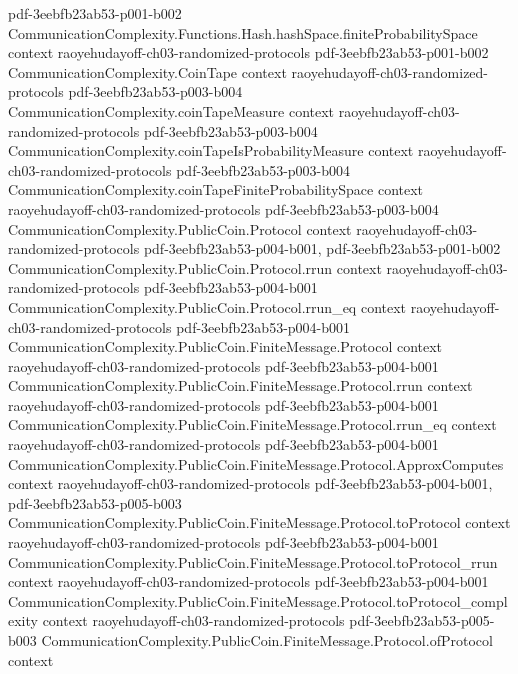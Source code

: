 \begin{theorem}
  {pdf-3eebfb23ab53-p001-b002}
\proofstep
  {CommunicationComplexity.Functions.Hash.hashSpace.finiteProbabilitySpace}
  {context}
  {raoyehudayoff-ch03-randomized-protocols}
  {pdf-3eebfb23ab53-p001-b002}
\proofstep
  {CommunicationComplexity.CoinTape}
  {context}
  {raoyehudayoff-ch03-randomized-protocols}
  {pdf-3eebfb23ab53-p003-b004}
\proofstep
  {CommunicationComplexity.coinTapeMeasure}
  {context}
  {raoyehudayoff-ch03-randomized-protocols}
  {pdf-3eebfb23ab53-p003-b004}
\proofstep
  {CommunicationComplexity.coinTapeIsProbabilityMeasure}
  {context}
  {raoyehudayoff-ch03-randomized-protocols}
  {pdf-3eebfb23ab53-p003-b004}
\proofstep
  {CommunicationComplexity.coinTapeFiniteProbabilitySpace}
  {context}
  {raoyehudayoff-ch03-randomized-protocols}
  {pdf-3eebfb23ab53-p003-b004}
\proofstep
  {CommunicationComplexity.PublicCoin.Protocol}
  {context}
  {raoyehudayoff-ch03-randomized-protocols}
  {pdf-3eebfb23ab53-p004-b001,
    pdf-3eebfb23ab53-p001-b002}
\proofstep
  {CommunicationComplexity.PublicCoin.Protocol.rrun}
  {context}
  {raoyehudayoff-ch03-randomized-protocols}
  {pdf-3eebfb23ab53-p004-b001}
\proofstep
  {CommunicationComplexity.PublicCoin.Protocol.rrun_eq}
  {context}
  {raoyehudayoff-ch03-randomized-protocols}
  {pdf-3eebfb23ab53-p004-b001}
\proofstep
  {CommunicationComplexity.PublicCoin.FiniteMessage.Protocol}
  {context}
  {raoyehudayoff-ch03-randomized-protocols}
  {pdf-3eebfb23ab53-p004-b001}
\proofstep
  {CommunicationComplexity.PublicCoin.FiniteMessage.Protocol.rrun}
  {context}
  {raoyehudayoff-ch03-randomized-protocols}
  {pdf-3eebfb23ab53-p004-b001}
\proofstep
  {CommunicationComplexity.PublicCoin.FiniteMessage.Protocol.rrun_eq}
  {context}
  {raoyehudayoff-ch03-randomized-protocols}
  {pdf-3eebfb23ab53-p004-b001}
\proofstep
  {CommunicationComplexity.PublicCoin.FiniteMessage.Protocol.ApproxComputes}
  {context}
  {raoyehudayoff-ch03-randomized-protocols}
  {pdf-3eebfb23ab53-p004-b001,
    pdf-3eebfb23ab53-p005-b003}
\proofstep
  {CommunicationComplexity.PublicCoin.FiniteMessage.Protocol.toProtocol}
  {context}
  {raoyehudayoff-ch03-randomized-protocols}
  {pdf-3eebfb23ab53-p004-b001}
\proofstep
  {CommunicationComplexity.PublicCoin.FiniteMessage.Protocol.toProtocol_rrun}
  {context}
  {raoyehudayoff-ch03-randomized-protocols}
  {pdf-3eebfb23ab53-p004-b001}
\proofstep
  {CommunicationComplexity.PublicCoin.FiniteMessage.Protocol.toProtocol_complexity}
  {context}
  {raoyehudayoff-ch03-randomized-protocols}
  {pdf-3eebfb23ab53-p005-b003}
\proofstep
  {CommunicationComplexity.PublicCoin.FiniteMessage.Protocol.ofProtocol}
  {context}

\end{theorem}
